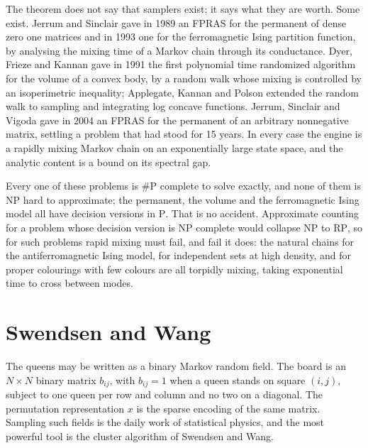\documentclass[11pt,twoside,openany]{book}
\theoremstyle{plain}
\theoremstyle{definition}
\theoremstyle{remark}
\newcommand{\RP}{\mathrm{RP}}
\newcommand{\NP}{\mathrm{NP}}
\newcommand{\Pc}{\mathrm{P}}
\newcommand{\sharpP}{\#\mathrm{P}}
\begin{document}
The theorem does not say that samplers exist; it says what they are worth. Some exist. Jerrum and Sinclair gave in 1989 an FPRAS for the permanent of dense zero one matrices and in 1993 one for the ferromagnetic Ising partition function, by analysing the mixing time of a Markov chain through its conductance. Dyer, Frieze and Kannan gave in 1991 the first polynomial time randomized algorithm for the volume of a convex body, by a random walk whose mixing is controlled by an isoperimetric inequality; Applegate, Kannan and Polson extended the random walk to sampling and integrating log concave functions. Jerrum, Sinclair and Vigoda gave in 2004 an FPRAS for the permanent of an arbitrary nonnegative matrix, settling a problem that had stood for 15 years. In every case the engine is a rapidly mixing Markov chain on an exponentially large state space, and the analytic content is a bound on its spectral gap.

Every one of these problems is $\sharpP$ complete to solve exactly, and none of them is $\NP$ hard to approximate; the permanent, the volume and the ferromagnetic Ising model all have decision versions in $\Pc$. That is no accident. Approximate counting for a problem whose decision version is $\NP$ complete would collapse $\NP$ to $\RP$, so for such problems rapid mixing must fail, and fail it does: the natural chains for the antiferromagnetic Ising model, for independent sets at high density, and for proper colourings with few colours are all torpidly mixing, taking exponential time to cross between modes.

\section{Swendsen and Wang}

The queens may be written as a binary Markov random field. The board is an $N \times N$ binary matrix $b_{ij}$, with $b_{ij} = 1$ when a queen stands on square $(i, j)$, subject to one queen per row and column and no two on a diagonal. The permutation representation $x$ is the sparse encoding of the same matrix. Sampling such fields is the daily work of statistical physics, and the most powerful tool is the cluster algorithm of Swendsen and Wang.
\end{document}
